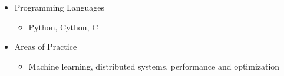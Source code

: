 \begin{itemize}
\tightlist
\item
  Programming Languages

  \begin{itemize}
  \tightlist
  \item
    Python, Cython, C
  \end{itemize}
\item
  Areas of Practice

  \begin{itemize}
  \tightlist
  \item
    Machine learning, distributed systems, performance and optimization
  \end{itemize}
\end{itemize}
